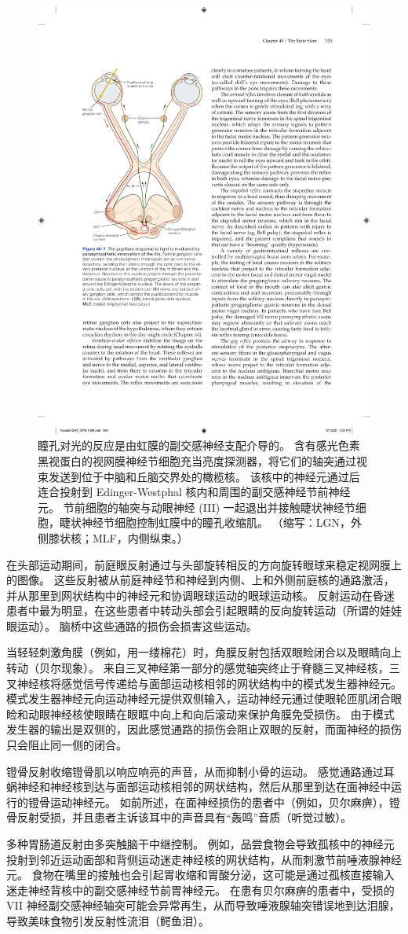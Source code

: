\begin{figure}[htbp]
	\centering
	\includegraphics[width=0.45\linewidth]{chap40/fig_40_7}
	\caption{瞳孔对光的反应是由虹膜的副交感神经支配介导的。 含有感光色素黑视蛋白的视网膜神经节细胞充当亮度探测器，将它们的轴突通过视束发送到位于中脑和丘脑交界处的橄榄核。 该核中的神经元通过后连合投射到 Edinger-Westphal 核内和周围的副交感神经节前神经元。 节前细胞的轴突与动眼神经 (III) 一起退出并接触睫状神经节细胞，睫状神经节细胞控制虹膜中的瞳孔收缩肌。 （缩写：LGN，外侧膝状核；MLF，内侧纵束。）}
	\label{fig:40_7}
\end{figure}

在头部运动期间，前庭眼反射通过与头部旋转相反的方向旋转眼球来稳定视网膜上的图像。 这些反射被从前庭神经节和神经到内侧、上和外侧前庭核的通路激活，并从那里到网状结构中的神经元和协调眼球运动的眼球运动核。 反射运动在昏迷患者中最为明显，在这些患者中转动头部会引起眼睛的反向旋转运动（所谓的娃娃眼运动）。 脑桥中这些通路的损伤会损害这些运动。

当轻轻刺激角膜（例如，用一缕棉花）时，角膜反射包括双眼睑闭合以及眼睛向上转动（贝尔现象）。 来自三叉神经第一部分的感觉轴突终止于脊髓三叉神经核，三叉神经核将感觉信号传递给与面部运动核相邻的网状结构中的模式发生器神经元。 模式发生器神经元向运动神经元提供双侧输入，运动神经元通过使眼轮匝肌闭合眼睑和动眼神经核使眼睛在眼眶中向上和向后滚动来保护角膜免受损伤。 由于模式发生器的输出是双侧的，因此感觉通路的损伤会阻止双眼的反射，而面神经的损伤只会阻止同一侧的闭合。

镫骨反射收缩镫骨肌以响应响亮的声音，从而抑制小骨的运动。 感觉通路通过耳蜗神经和神经核到达与面部运动核相邻的网状结构，然后从那里到达在面神经中运行的镫骨运动神经元。 如前所述，在面神经损伤的患者中（例如，贝尔麻痹），镫骨反射受损，并且患者主诉该耳中的声音具有“轰鸣”音质（听觉过敏）。

多种胃肠道反射由多突触脑干中继控制。 例如，品尝食物会导致孤核中的神经元投射到邻近运动面部和背侧运动迷走神经核的网状结构，从而刺激节前唾液腺神经元。 食物在嘴里的接触也会引起胃收缩和胃酸分泌，这可能是通过孤核直接输入迷走神经背核中的副交感神经节前胃神经元。 在患有贝尔麻痹的患者中，受损的 VII 神经副交感神经轴突可能会异常再生，从而导致唾液腺轴突错误地到达泪腺，导致美味食物引发反射性流泪（鳄鱼泪）。

